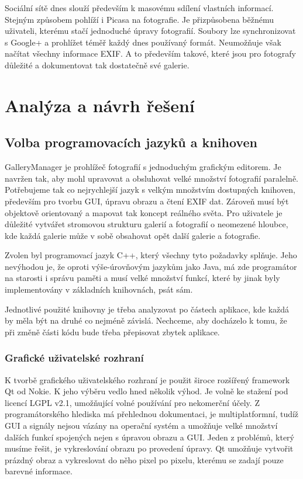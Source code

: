\documentclass[11pt,twoside,a4paper]{book}
\begin{document}
\indent
Sociální sítě dnes slouží především k masovému sdílení vlastních informací. Stejným způsobem pohlíží i Picasa na fotografie. Je přizpůsobena běžnému uživateli, kterému stačí jednoduché úpravy fotografií. Soubory lze synchronizovat s Google+ a prohlížet téměř každý dnes používaný formát. Neumožňuje však načítat všechny informace EXIF. A to především takové, které jsou pro fotografy důležité a dokumentovat tak dostatečně své galerie.


%

\chapter{Analýza a návrh řešení}
\section{Volba programovacích jazyků a knihoven}
\noindent
GalleryManager je prohlížeč fotografií s jednoduchým grafickým editorem. Je navržen tak, aby mohl upravovat a obsluhovat velké množství fotografií paralelně. Potřebujeme tak co nejrychlejší jazyk s velkým množstvím dostupných knihoven, především pro tvorbu GUI, úpravu obrazu a čtení EXIF dat. Zároveň musí být objektově orientovaný a mapovat tak koncept reálného světa. Pro uživatele je důležité vytvářet stromovou strukturu galerií a fotografií o neomezené hloubce, kde každá galerie může v sobě obsahovat opět další galerie a fotografie. 

\indent 
Zvolen byl programovací jazyk C++, který všechny tyto požadavky splňuje. Jeho nevýhodou je, že oproti výše-úrovňovým jazykům jako Java, má zde programátor na starosti i správu paměti a musí velké množství funkcí, které by jinak byly implementovány v základních knihovnách, psát sám.

\indent
Jednotlivé použité knihovny je třeba analyzovat po částech aplikace, kde každá by měla být na druhé co nejméně závislá. Nechceme, aby docházelo k tomu, že při změně části kódu bude třeba přepisovat zbytek aplikace.

\subsection{Grafické uživatelské rozhraní}
\indent
K tvorbě grafického uživatelského rozhraní je použit široce rozšířený framework Qt od Nokie. K jeho výběru vedlo hned několik výhod. Je volně ke stažení pod licencí LGPL v2.1, umožňující volné používání pro nekomerční účely. Z programátorského hlediska má přehlednou dokumentaci, je multiplatformní, tudíž GUI a signály nejsou vázány na operační systém a umožňuje velké množství dalších funkcí spojených nejen s úpravou obrazu a GUI. Jeden z problémů, který musíme řešit, je vykreslování obrazu po provedení úpravy. Qt umožňuje vytvořit prázdný obraz a vykreslovat do něho pixel po pixelu, kterému se zadají pouze barevné informace.
\end{document}
